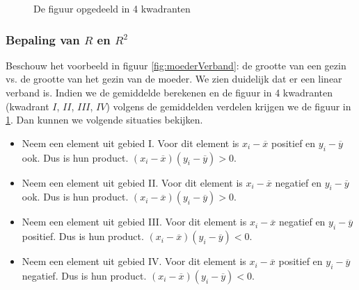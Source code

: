 
\begin{figure}[t]%
  \caption{De figuur opgedeeld in 4 kwadranten}%
  \label{fig:kwadranten}%
\end{figure}

\subsubsection{Bepaling van $R$ en $R^{2}$}
\label{sec:determinatiecoef}
Beschouw het voorbeeld in figuur \ref{fig:moederVerband}:  de grootte van een gezin vs. de grootte van het gezin van de moeder. We zien duidelijk dat er een linear verband is. Indien we de gemiddelde berekenen en de figuur in 4 kwadranten (kwadrant $I$, $II$, $III$, $IV$) volgens de gemiddelden verdelen krijgen we de figuur in \ref{fig:kwadranten}.  Dan kunnen we volgende situaties bekijken.

\begin{itemize}
  \item Neem een element uit gebied I. Voor dit element is $x_{i} - \overline{x}$ positief en $y_{i} - \overline{y}$ ook. Dus is hun product. $(x_{i} - \overline{x}) (y_{i} - \overline{y}) > 0$.
  \item Neem een element uit gebied II. Voor dit element is $x_{i} - \overline{x}$ negatief en $y_{i} - \overline{y}$ ook. Dus is hun product. $(x_{i} - \overline{x}) (y_{i} - \overline{y}) > 0$.
  \item Neem een element uit gebied III. Voor dit element is $x_{i} - \overline{x}$ negatief en $y_{i} - \overline{y}$ positief. Dus is hun product. $(x_{i} - \overline{x}) (y_{i} - \overline{y}) < 0$.
  \item Neem een element uit gebied IV. Voor dit element is $x_{i} - \overline{x}$ positief en $y_{i} - \overline{y}$ negatief. Dus is hun product. $(x_{i} - \overline{x}) (y_{i} - \overline{y}) < 0$.
\end{itemize}

